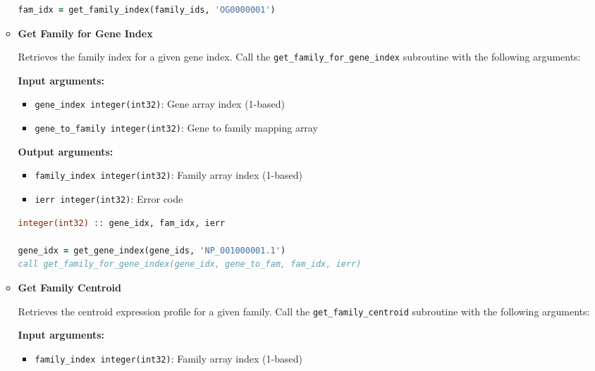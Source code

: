\begin{enumerate}
\begin{itemize}
\begin{lstlisting}[language=Fortran, caption={Find Family Index}]
fam_idx = get_family_index(family_ids, 'OG0000001')
                  \end{lstlisting}
                  
            \item \textbf{Get Family for Gene Index}
                  
                  Retrieves the family index for a given gene index. Call the \texttt{get\_family\_for\_gene\_index}
                  subroutine with the following arguments:
                  
                  \textbf{Input arguments:}
                  \begin{itemize}
                    \item \texttt{gene\_index integer(int32)}: Gene array index (1-based)
                          
                    \item \texttt{gene\_to\_family integer(int32)}: Gene to family mapping
                          array
                  \end{itemize}
                  \textbf{Output arguments:}
                  \begin{itemize}
                    \item \texttt{family\_index integer(int32)}: Family array index (1-based)
                          
                    \item \texttt{ierr integer(int32)}: Error code
                  \end{itemize}
                  \begin{lstlisting}[language=Fortran, caption={Get Family for Gene}]
integer(int32) :: gene_idx, fam_idx, ierr

gene_idx = get_gene_index(gene_ids, 'NP_001000001.1')
call get_family_for_gene_index(gene_idx, gene_to_fam, fam_idx, ierr)
                  \end{lstlisting}
                  
            \item \textbf{Get Family Centroid}
                  
                  Retrieves the centroid expression profile for a given family. Call the
                  \texttt{get\_family\_centroid} subroutine with the following arguments:
                  
                  \textbf{Input arguments:}
                  \begin{itemize}
                    \item \texttt{family\_index integer(int32)}: Family array index (1-based)
                          

\end{itemize}
\end{itemize}
\end{enumerate}
